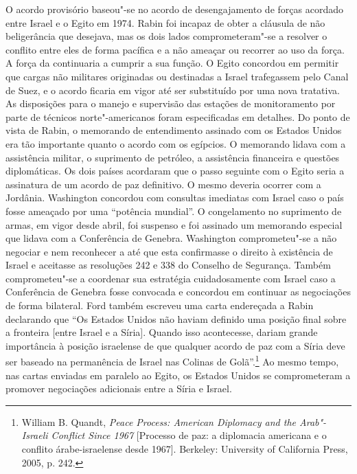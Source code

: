 O acordo provisório baseou"-se no acordo de desengajamento de forças
acordado entre Israel e o Egito em 1974. Rabin foi incapaz de obter a
cláusula de não beligerância que desejava, mas os dois lados
comprometeram"-se a resolver o conflito entre eles de forma pacífica e a
não ameaçar ou recorrer ao uso da força. A força da  continuaria a
cumprir a sua função. O Egito concordou em permitir que cargas
não militares originadas ou destinadas a Israel trafegassem pelo Canal
de Suez, e o acordo ficaria em vigor até ser substituído por uma nova
tratativa. As disposições para o manejo e supervisão das estações de
monitoramento por parte de técnicos norte"-americanos foram especificadas
em detalhes. Do ponto de vista de Rabin, o memorando de entendimento
assinado com os Estados Unidos era tão importante quanto o acordo com os
egípcios. O memorando lidava com a assistência militar, o suprimento de
petróleo, a assistência financeira e questões diplomáticas. Os dois
países acordaram que o passo seguinte com o Egito seria a assinatura de
um acordo de paz definitivo. O mesmo deveria ocorrer com a Jordânia.
Washington concordou com consultas imediatas com Israel caso o país
fosse ameaçado por uma ``potência mundial''. O congelamento no
suprimento de armas, em vigor desde abril, foi suspenso e foi assinado
um memorando especial que lidava com a Conferência de Genebra.
Washington comprometeu"-se a não negociar e nem reconhecer a  até que
esta confirmasse o direito à existência de Israel e aceitasse as
resoluções 242 e 338 do Conselho de Segurança. Também comprometeu"-se a
coordenar sua estratégia cuidadosamente com Israel caso a Conferência de
Genebra fosse convocada e concordou em continuar as negociações de forma
bilateral. Ford também escreveu uma carta endereçada a Rabin declarando
que ``Os Estados Unidos não haviam definido uma posição final sobre a
fronteira {[}entre Israel e a Síria{]}. Quando isso acontecesse, dariam grande
importância à posição israelense de que qualquer acordo de paz com a
Síria deve ser baseado na permanência de Israel nas Colinas de
Golã''.\footnote{William B. Quandt, \emph{Peace Process: American Diplomacy and the
Arab"-Israeli Conflict Since 1967} {[}Processo de paz: a diplomacia americana e o conflito árabe-israelense desde 1967{]}. Berkeley: University of California
Press, 2005, p. 242.} Ao mesmo tempo, nas cartas enviadas em paralelo ao
Egito, os Estados Unidos se comprometeram a promover negociações
adicionais entre a Síria e Israel.

